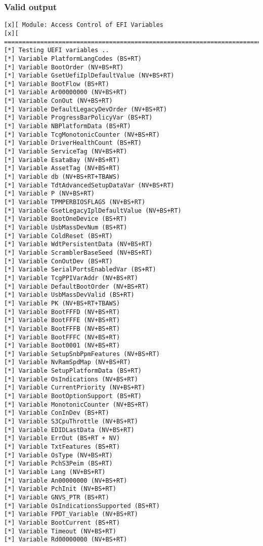 \hypertarget{valid-output-18}{%
\subsubsection{Valid output}\label{valid-output-18}}

\begin{verbatim}
[x][ Module: Access Control of EFI Variables
[x][ =======================================================================
[*] Testing UEFI variables ..
[*] Variable PlatformLangCodes (BS+RT)
[*] Variable BootOrder (NV+BS+RT)
[*] Variable GsetUefiIplDefaultValue (NV+BS+RT)
[*] Variable BootFlow (BS+RT)
[*] Variable Ar00000000 (NV+BS+RT)
[*] Variable ConOut (NV+BS+RT)
[*] Variable DefaultLegacyDevOrder (NV+BS+RT)
[*] Variable ProgressBarPolicyVar (BS+RT)
[*] Variable NBPlatformData (BS+RT)
[*] Variable TcgMonotonicCounter (NV+BS+RT)
[*] Variable DriverHealthCount (BS+RT)
[*] Variable ServiceTag (NV+BS+RT)
[*] Variable EsataBay (NV+BS+RT)
[*] Variable AssetTag (NV+BS+RT)
[*] Variable db (NV+BS+RT+TBAWS)
[*] Variable TdtAdvancedSetupDataVar (NV+BS+RT)
[*] Variable P (NV+BS+RT)
[*] Variable TPMPERBIOSFLAGS (NV+BS+RT)
[*] Variable GsetLegacyIplDefaultValue (NV+BS+RT)
[*] Variable BootOneDevice (BS+RT)
[*] Variable UsbMassDevNum (BS+RT)
[*] Variable ColdReset (BS+RT)
[*] Variable WdtPersistentData (NV+BS+RT)
[*] Variable ScramblerBaseSeed (NV+BS+RT)
[*] Variable ConOutDev (BS+RT)
[*] Variable SerialPortsEnabledVar (BS+RT)
[*] Variable TcgPPIVarAddr (NV+BS+RT)
[*] Variable DefaultBootOrder (NV+BS+RT)
[*] Variable UsbMassDevValid (BS+RT)
[*] Variable PK (NV+BS+RT+TBAWS)
[*] Variable BootFFFD (NV+BS+RT)
[*] Variable BootFFFE (NV+BS+RT)
[*] Variable BootFFFB (NV+BS+RT)
[*] Variable BootFFFC (NV+BS+RT)
[*] Variable Boot0001 (NV+BS+RT)
[*] Variable SetupSnbPpmFeatures (NV+BS+RT)
[*] Variable NvRamSpdMap (NV+BS+RT)
[*] Variable SetupPlatformData (BS+RT)
[*] Variable OsIndications (NV+BS+RT)
[*] Variable CurrentPriority (NV+BS+RT)
[*] Variable BootOptionSupport (BS+RT)
[*] Variable MonotonicCounter (NV+BS+RT)
[*] Variable ConInDev (BS+RT)
[*] Variable S3CpuThrottle (NV+BS+RT)
[*] Variable EDIDLastData (NV+BS+RT)
[*] Variable ErrOut (BS+RT + NV)
[*] Variable TxtFeatures (BS+RT)
[*] Variable OsType (NV+BS+RT)
[*] Variable PchS3Peim (BS+RT)
[*] Variable Lang (NV+BS+RT)
[*] Variable An00000000 (NV+BS+RT)
[*] Variable PchInit (NV+BS+RT)
[*] Variable GNVS_PTR (BS+RT)
[*] Variable OsIndicationsSupported (BS+RT)
[*] Variable FPDT_Variable (NV+BS+RT)
[*] Variable BootCurrent (BS+RT)
[*] Variable Timeout (NV+BS+RT)
[*] Variable Rd00000000 (NV+BS+RT)

\end{verbatim}
